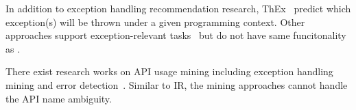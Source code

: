 In addition to exception handling recommendation research,
ThEx~\cite{throw-ase22} predict which exception(s) will be thrown
under a given programming context. Other approaches support
exception-relevant tasks~\cite{8595064,9462986,9700190} but do not
have same funcitonality as {\tool}.

There exist research works on API usage mining including exception
handling mining and error
detection~\cite{suresh-icse09,mithun-fase09,BW08,NNP+09,PG09,WLWXM11,NNN+12a,PJAG12,MM13,RBMR13,SBA+15,NPVN16,ANNN+16,LHXRM16,NPVN16b,TR16,MCJ17,ZGCHPG17,fse16}. Similar to IR, the
mining approaches cannot handle the API name ambiguity.



